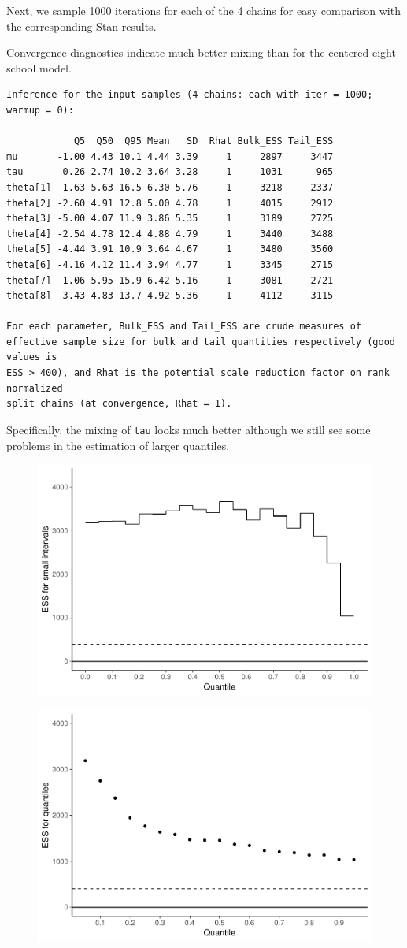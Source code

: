\documentclass[american,]{article}
\begin{document}
Next, we sample 1000 iterations for each of the 4 chains for easy
comparison with the corresponding Stan results.

Convergence diagnostics indicate much better mixing than for the
centered eight school model.

\begin{verbatim}
Inference for the input samples (4 chains: each with iter = 1000; warmup = 0):

            Q5  Q50  Q95 Mean   SD  Rhat Bulk_ESS Tail_ESS
mu       -1.00 4.43 10.1 4.44 3.39     1     2897     3447
tau       0.26 2.74 10.2 3.64 3.28     1     1031      965
theta[1] -1.63 5.63 16.5 6.30 5.76     1     3218     2337
theta[2] -2.60 4.91 12.8 5.00 4.78     1     4015     2912
theta[3] -5.00 4.07 11.9 3.86 5.35     1     3189     2725
theta[4] -2.54 4.78 12.4 4.88 4.79     1     3440     3488
theta[5] -4.44 3.91 10.9 3.64 4.67     1     3480     3560
theta[6] -4.16 4.12 11.4 3.94 4.77     1     3345     2715
theta[7] -1.06 5.95 15.9 6.42 5.16     1     3081     2721
theta[8] -3.43 4.83 13.7 4.92 5.36     1     4112     3115

For each parameter, Bulk_ESS and Tail_ESS are crude measures of 
effective sample size for bulk and tail quantities respectively (good values is 
ESS > 400), and Rhat is the potential scale reduction factor on rank normalized
split chains (at convergence, Rhat = 1).
\end{verbatim}

Specifically, the mixing of \texttt{tau} looks much better although we
still see some problems in the estimation of larger quantiles.

\begin{figure}[tp]
  \centering
  \includegraphics[width=0.6\linewidth]{graphics/local-ess-jags-ncp-tau-1.pdf}
\end{figure}

\begin{figure}[tp]
  \centering
  \includegraphics[width=0.6\linewidth]{graphics/quantile-ess-jags-ncp-tau-1.pdf}
\end{figure}
\end{document}
